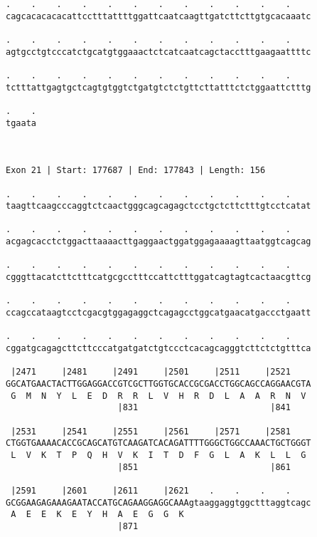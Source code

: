 \documentclass{article}
\begin{document}
\begin{Verbatim}
.    .    .    .    .    .    .    .    .    .    .    .    
cagcacacacacattcctttattttggattcaatcaagttgatcttcttgtgcacaaatc
                                                            
.    .    .    .    .    .    .    .    .    .    .    .    
agtgcctgtcccatctgcatgtggaaactctcatcaatcagctacctttgaagaattttc
                                                            
.    .    .    .    .    .    .    .    .    .    .    .    
tctttattgagtgctcagtgtggtctgatgtctctgttcttatttctctggaattctttg
                                                            
.    .
tgaata
      
      
 
Exon 21 | Start: 177687 | End: 177843 | Length: 156
 
.    .    .    .    .    .    .    .    .    .    .    .    
taagttcaagcccaggtctcaactgggcagcagagctcctgctcttctttgtcctcatat
                                                            
.    .    .    .    .    .    .    .    .    .    .    .    
acgagcacctctggacttaaaacttgaggaactggatggagaaaagttaatggtcagcag
                                                            
.    .    .    .    .    .    .    .    .    .    .    .    
cgggttacatcttctttcatgcgcctttccattctttggatcagtagtcactaacgttcg
                                                            
.    .    .    .    .    .    .    .    .    .    .    .    
ccagccataagtcctcgacgtggagaggctcagagcctggcatgaacatgaccctgaatt
                                                            
.    .    .    .    .    .    .    .    .    .    .    .    
cggatgcagagcttcttcccatgatgatctgtccctcacagcagggtcttctctgtttca
                                                            
 |2471     |2481     |2491     |2501     |2511     |2521    
GGCATGAACTACTTGGAGGACCGTCGCTTGGTGCACCGCGACCTGGCAGCCAGGAACGTA
 G  M  N  Y  L  E  D  R  R  L  V  H  R  D  L  A  A  R  N  V 
                      |831                          |841    
  
 |2531     |2541     |2551     |2561     |2571     |2581    
CTGGTGAAAACACCGCAGCATGTCAAGATCACAGATTTTGGGCTGGCCAAACTGCTGGGT
 L  V  K  T  P  Q  H  V  K  I  T  D  F  G  L  A  K  L  L  G 
                      |851                          |861    
  
 |2591     |2601     |2611     |2621    .    .    .    .    
GCGGAAGAGAAAGAATACCATGCAGAAGGAGGCAAAgtaaggaggtggctttaggtcagc
 A  E  E  K  E  Y  H  A  E  G  G  K                         
                      |871                                  
  

\end{Verbatim}
\end{document}
